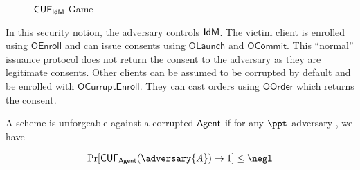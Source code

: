\begin{itemize}
\begin{definition}
\begin{figure*}
{{\begin{pchstack}[center, space=0.2cm, boxed]
\begin{pcvstack}


    \end{pcvstack}
    \end{pchstack}
}}
\caption{$\mathsf{CUF}_{\textsf{IdM}}$ Game}
\label{game:cuf_idm}
\end{figure*}
\end{definition}

In this security notion, the adversary controls $\textsf{IdM}$. The victim client is enrolled using $\mathsf{OEnroll}$ and can issue consents using $\mathsf{OLaunch}$ and $\mathsf{OCommit}$. This ``normal'' issuance protocol does not return the consent to the adversary as they are legitimate consents. Other clients can be assumed to be corrupted by default and be enrolled with  $\mathsf{OCurruptEnroll}$. They can cast orders using $\mathsf{OOrder}$ which returns the consent.

\begin{definition}
    A \primitive scheme is unforgeable against a corrupted $\textsf{Agent}$ if for any $\ppt$ adversary , we have

    \begin{align*}
    \Pr[\cuf_\signserv(\adversary{A}) \rightarrow 1] \le \negl
    \end{align*}


\end{definition}
\end{itemize}
